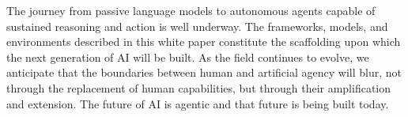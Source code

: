 The journey from passive language models to autonomous agents capable of sustained reasoning and action is well underway. The frameworks, models, and environments described in this white paper constitute the scaffolding upon which the next generation of AI will be built. As the field continues to evolve, we anticipate that the boundaries between human and artificial agency will blur, not through the replacement of human capabilities, but through their amplification and extension. The future of AI is agentic and that future is being built today.
